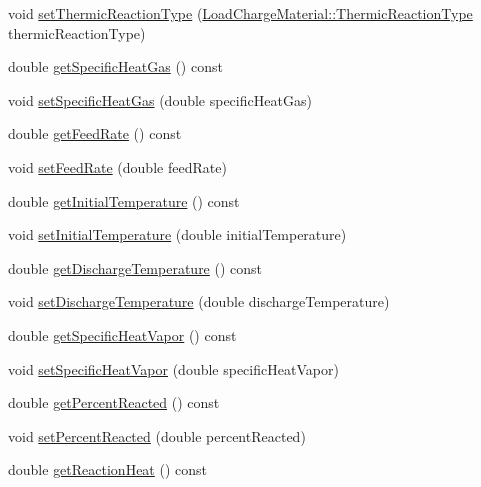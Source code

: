 \begin{DoxyCompactItemize}
\item 
void \hyperlink{class_gas_load_charge_material_ac48eb07a3008f1dc0ff433353b59536d}{set\+Thermic\+Reaction\+Type} (\hyperlink{class_load_charge_material_a51d4263e865a5d86236622dd3fe23fd1}{Load\+Charge\+Material\+::\+Thermic\+Reaction\+Type} thermic\+Reaction\+Type)
\item 
double \hyperlink{class_gas_load_charge_material_a66e956e7a52b1032a3e8a725f26fa580}{get\+Specific\+Heat\+Gas} () const
\item 
void \hyperlink{class_gas_load_charge_material_a07bf6d4ee9161683fbeb3baad16ea7be}{set\+Specific\+Heat\+Gas} (double specific\+Heat\+Gas)
\item 
double \hyperlink{class_gas_load_charge_material_ae14ebe9b7091a491166174968505b6ee}{get\+Feed\+Rate} () const
\item 
void \hyperlink{class_gas_load_charge_material_a922b728dfd109d1c1684d7dfad82ec8e}{set\+Feed\+Rate} (double feed\+Rate)
\item 
double \hyperlink{class_gas_load_charge_material_af8a83c3720d108baa196394105822db7}{get\+Initial\+Temperature} () const
\item 
void \hyperlink{class_gas_load_charge_material_aec9ddfce5e31099b6a047e3d98d80d47}{set\+Initial\+Temperature} (double initial\+Temperature)
\item 
double \hyperlink{class_gas_load_charge_material_a6baaf6ad65e2a3d1fa90b7c007bc3c53}{get\+Discharge\+Temperature} () const
\item 
void \hyperlink{class_gas_load_charge_material_a6c53344d5370a1e9b7321a530a6843c0}{set\+Discharge\+Temperature} (double discharge\+Temperature)
\item 
double \hyperlink{class_gas_load_charge_material_a9a07e86938bb831e51ac3f53f696a3c3}{get\+Specific\+Heat\+Vapor} () const
\item 
void \hyperlink{class_gas_load_charge_material_a7498eba84bb8bdfc5344f0e44418260b}{set\+Specific\+Heat\+Vapor} (double specific\+Heat\+Vapor)
\item 
double \hyperlink{class_gas_load_charge_material_af47b4c6c3e547325cadd81cbb09937ee}{get\+Percent\+Reacted} () const
\item 
void \hyperlink{class_gas_load_charge_material_a7142cb6bbfba53d640dd6f1590fe32f6}{set\+Percent\+Reacted} (double percent\+Reacted)
\item 
double \hyperlink{class_gas_load_charge_material_a605eaf21d1f25f27b53627aeb903c93d}{get\+Reaction\+Heat} () const
\item 

\end{DoxyCompactItemize}
